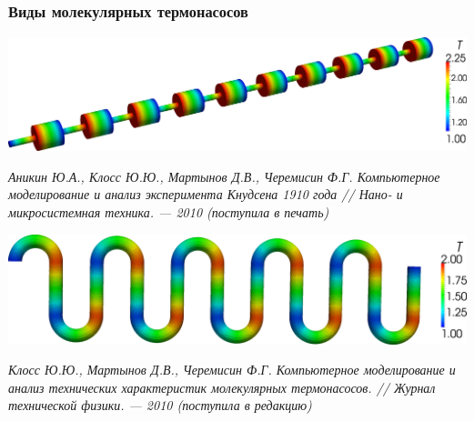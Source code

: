\documentclass[ucs]{beamer}
\begin{document}
\subsection{}
\begin{frame}
	\frametitle{Виды молекулярных термонасосов}
	\begin{center}
	\includegraphics[width=0.7\columnwidth]{Klassic.png}
	\end{center}
	{\footnotesize \textit{Аникин Ю.А., Клосс Ю.Ю., Мартынов Д.В., Черемисин Ф.Г. Компьютерное моделирование и анализ эксперимента Кнудсена 1910 года // Нано- и микросистемная техника. — 2010 (поступила в печать)}}
	\begin{center}
	\includegraphics[width=0.7\columnwidth]{Snake.png}
	\end{center}
	{\footnotesize \textit{Клосс Ю.Ю., Мартынов Д.В., Черемисин Ф.Г. Компьютерное моделирование и анализ технических характеристик молекулярных термонасосов. // Журнал технической физики. — 2010 (поступила в редакцию)}}
\end{frame}
\end{document}
